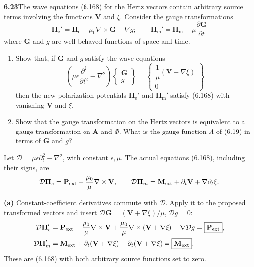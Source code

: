 \par\bigskip
\noindent\textbf{6.23}\quad The wave equations (6.168) for the Hertz vectors contain arbitrary source terms involving the functions $\mathbf{V}$ and $\xi$. Consider the gauge transformations
\[
\boldsymbol{\Pi}_{\mathrm{e}}'=\boldsymbol{\Pi}_{\mathrm{e}}+\mu_{0}\nabla\times\mathbf{G}-\nabla g;\qquad
\boldsymbol{\Pi}_{\mathrm{m}}'=\boldsymbol{\Pi}_{\mathrm{m}}-\mu\frac{\partial\mathbf{G}}{\partial t}
\]
where $\mathbf{G}$ and $g$ are well-behaved functions of space and time.
\begin{enumerate}
\item[(a)] Show that, if $\mathbf{G}$ and $g$ satisfy the wave equations
\[
\left(\mu\epsilon\frac{\partial^{2}}{\partial t^{2}}-\nabla^{2}\right)\begin{Bmatrix}\mathbf{G}\\ g\end{Bmatrix}
=\begin{Bmatrix}\dfrac{1}{\mu}(\mathbf{V}+\nabla\xi)\\[8pt] 0\end{Bmatrix}
\]
then the new polarization potentials $\boldsymbol{\Pi}_{\mathrm{e}}'$ and $\boldsymbol{\Pi}_{\mathrm{m}}'$ satisfy (6.168) with vanishing $\mathbf{V}$ and $\xi$.
\item[(b)] Show that the gauge transformation on the Hertz vectors is equivalent to a gauge transformation on $\mathbf{A}$ and $\Phi$. What is the gauge function $\Lambda$ of (6.19) in terms of $\mathbf{G}$ and $g$?
\end{enumerate}
\solution

Let $\mathcal D=\mu\epsilon\partial_t^2-\nabla^2$, with constant
$\epsilon,\mu$. The actual equations (6.168), including their signs, are
\[
\mathcal D\boldsymbol\Pi_e=\mathbf P_{\rm ext}
-\frac{\mu_0}{\mu}\nabla\times\mathbf V,\qquad
\mathcal D\boldsymbol\Pi_m=\mathbf M_{\rm ext}
+\partial_t\mathbf V+\nabla\partial_t\xi.
\]

\textbf{(a)} Constant-coefficient derivatives commute with $\mathcal D$.
Apply it to the proposed transformed vectors and insert
$\mathcal D\mathbf G=(\mathbf V+\nabla\xi)/\mu$,
$\mathcal Dg=0$:
\begin{align*}
\mathcal D\boldsymbol\Pi'_e
&=\mathbf P_{\rm ext}-\frac{\mu_0}{\mu}\nabla\times\mathbf V
+\frac{\mu_0}{\mu}\nabla\times(\mathbf V+\nabla\xi)
-\nabla\mathcal Dg
=\boxed{\mathbf P_{\rm ext}},\\
\mathcal D\boldsymbol\Pi'_m
&=\mathbf M_{\rm ext}+\partial_t(\mathbf V+\nabla\xi)
-\partial_t(\mathbf V+\nabla\xi)
=\boxed{\mathbf M_{\rm ext}}.
\end{align*}
These are (6.168) with both arbitrary source functions set to zero.

